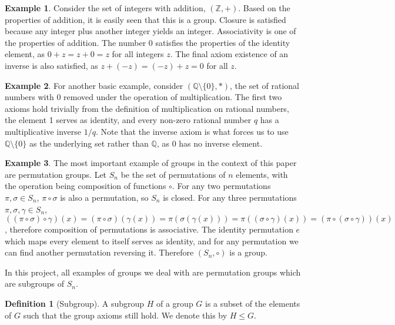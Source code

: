 \documentclass[11pt]{article} %
\theoremstyle{definition}
\newtheorem{definition}[theorem]{Definition}
\newtheorem*{example}{Example}
\theoremstyle{remark}
\newcommand{\ZZ}{\mathbb{Z}}
\begin{document}
\begin{example}
Consider the set of integers with addition, $(\ZZ, +)$. Based on the properties of addition, it is easily seen that this is a group. Closure is satisfied because any integer plus another integer yields an integer. Associativity is one of the properties of addition. The number $0$ satisfies the properties of the identity element, as $0 + z = z + 0 = z$ for all integers $z$. The final axiom existence of an inverse is also satisfied, as $z + (-z) = (-z) + z = 0$ for all $z$.
\end{example}

\begin{example}
For another basic example, consider $(\mathbb{Q} \setminus \lbrace 0 \rbrace, *)$, the set of rational numbers with 0 removed under the operation of multiplication. The first two axioms hold trivially from the definition of multiplication on rational numbers, the element 1 serves as identity, and every non-zero rational number $q$ has a multiplicative inverse $1/q$. Note that the inverse axiom is what forces us to use $\mathbb{Q} \setminus \lbrace 0 \rbrace$ as the underlying set rather than $\mathbb{Q}$, as 0 has no inverse element.
\end{example}

\begin{example}
The most important example of groups in the context of this paper are permutation groups. Let $S_n$ be the set of permutations of $n$ elements, with the operation being composition of functions $\circ$. For any two permutations $\pi, \sigma \in S_n$, $\pi \circ \sigma$ is also a permutation, so $S_n$ is closed. For any three permutations $\pi, \sigma, \gamma \in S_n$, $((\pi \circ \sigma) \circ \gamma)(x) = (\pi \circ \sigma)(\gamma(x)) = \pi (\sigma(\gamma(x))) = \pi((\sigma \circ \gamma)(x)) = (\pi \circ (\sigma \circ \gamma))(x)$, therefore composition of permutations is associative. The identity permutation $e$ which maps every element to itself serves as identity, and for any permutation we can find another permutation reversing it. Therefore $(S_n, \circ)$ is a group.
\end{example}

In this project, all examples of groups we deal with are permutation groups which are subgroups of $S_n$.

\begin{definition}[Subgroup]
A subgroup $H$ of a group $G$ is a subset of the elements of $G$ such that the group axioms still hold. We denote this by $H \leq G$.
\end{definition}
\end{document}
